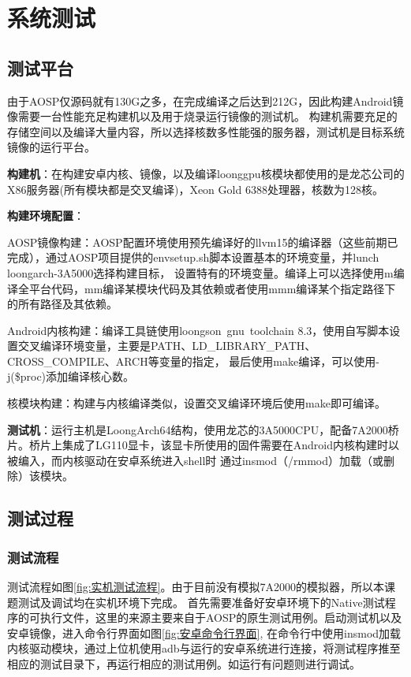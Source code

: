 
\chapter{系统测试}

\section{测试平台}
由于AOSP仅源码就有130G之多，在完成编译之后达到212G，因此构建Android镜像需要一台性能充足构建机以及用于烧录运行镜像的测试机。
构建机需要充足的存储空间以及编译大量内容，所以选择核数多性能强的服务器，测试机是目标系统镜像的运行平台。

\textbf{构建机}：在构建安卓内核、镜像，以及编译loonggpu核模块都使用的是龙芯公司的X86服务器(所有模块都是交叉编译)，Xeon Gold 6388处理器，核数为128核。

\textbf{构建环境配置}：

    AOSP镜像构建：AOSP配置环境使用预先编译好的llvm15的编译器（这些前期已完成），通过AOSP项目提供的envsetup.sh脚本设置基本的环境变量，并lunch loongarch-3A5000选择构建目标，
        设置特有的环境变量。编译上可以选择使用m编译全平台代码，mm编译某模块代码及其依赖或者使用mmm编译某个指定路径下的所有路径及其依赖。

    Android内核构建：编译工具链使用loongson\ gnu\ toolchain 8.3，使用自写脚本设置交叉编译环境变量，主要是PATH、LD\_LIBRARY\_PATH、CROSS\_COMPILE、ARCH等变量的指定，
        最后使用make编译，可以使用-j(\$proc)添加编译核心数。

    核模块构建：构建与内核编译类似，设置交叉编译环境后使用make即可编译。

\textbf{测试机}：运行主机是LoongArch64结构，使用龙芯的3A5000CPU，配备7A2000桥片。桥片上集成了LG110显卡，该显卡所使用的固件需要在Android内核构建时以被编入，而内核驱动在安卓系统进入shell时
    通过insmod（/rmmod）加载（或删除）该模块。

\section{测试过程}

\subsection{测试流程}
测试流程如图\ref{fig:实机测试流程}。由于目前没有模拟7A2000的模拟器，所以本课题测试及调试均在实机环境下完成。
首先需要准备好安卓环境下的Native测试程序的可执行文件，这里的来源主要来自于AOSP的原生测试用例。启动测试机以及安卓镜像，进入命令行界面如图\ref{fig:安卓命令行界面},
在命令行中使用insmod加载内核驱动模块，通过上位机使用adb与运行的安卓系统进行连接，将测试程序推至相应的测试目录下，再运行相应的测试用例。如运行有问题则进行调试。


